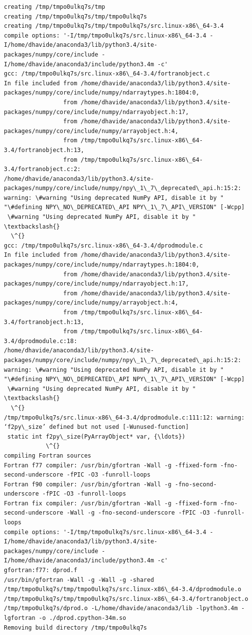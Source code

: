 \documentclass{article}
\begin{document}
\begin{Verbatim}[commandchars=\\\{\}]
creating /tmp/tmpo0ulkq7s/tmp
creating /tmp/tmpo0ulkq7s/tmp/tmpo0ulkq7s
creating /tmp/tmpo0ulkq7s/tmp/tmpo0ulkq7s/src.linux-x86\_64-3.4
compile options: '-I/tmp/tmpo0ulkq7s/src.linux-x86\_64-3.4 -I/home/dhavide/anaconda3/lib/python3.4/site-packages/numpy/core/include -I/home/dhavide/anaconda3/include/python3.4m -c'
gcc: /tmp/tmpo0ulkq7s/src.linux-x86\_64-3.4/fortranobject.c
In file included from /home/dhavide/anaconda3/lib/python3.4/site-packages/numpy/core/include/numpy/ndarraytypes.h:1804:0,
                 from /home/dhavide/anaconda3/lib/python3.4/site-packages/numpy/core/include/numpy/ndarrayobject.h:17,
                 from /home/dhavide/anaconda3/lib/python3.4/site-packages/numpy/core/include/numpy/arrayobject.h:4,
                 from /tmp/tmpo0ulkq7s/src.linux-x86\_64-3.4/fortranobject.h:13,
                 from /tmp/tmpo0ulkq7s/src.linux-x86\_64-3.4/fortranobject.c:2:
/home/dhavide/anaconda3/lib/python3.4/site-packages/numpy/core/include/numpy/npy\_1\_7\_deprecated\_api.h:15:2: warning: \#warning "Using deprecated NumPy API, disable it by " "\#defining NPY\_NO\_DEPRECATED\_API NPY\_1\_7\_API\_VERSION" [-Wcpp]
 \#warning "Using deprecated NumPy API, disable it by " \textbackslash{}
  \^{}
gcc: /tmp/tmpo0ulkq7s/src.linux-x86\_64-3.4/dprodmodule.c
In file included from /home/dhavide/anaconda3/lib/python3.4/site-packages/numpy/core/include/numpy/ndarraytypes.h:1804:0,
                 from /home/dhavide/anaconda3/lib/python3.4/site-packages/numpy/core/include/numpy/ndarrayobject.h:17,
                 from /home/dhavide/anaconda3/lib/python3.4/site-packages/numpy/core/include/numpy/arrayobject.h:4,
                 from /tmp/tmpo0ulkq7s/src.linux-x86\_64-3.4/fortranobject.h:13,
                 from /tmp/tmpo0ulkq7s/src.linux-x86\_64-3.4/dprodmodule.c:18:
/home/dhavide/anaconda3/lib/python3.4/site-packages/numpy/core/include/numpy/npy\_1\_7\_deprecated\_api.h:15:2: warning: \#warning "Using deprecated NumPy API, disable it by " "\#defining NPY\_NO\_DEPRECATED\_API NPY\_1\_7\_API\_VERSION" [-Wcpp]
 \#warning "Using deprecated NumPy API, disable it by " \textbackslash{}
  \^{}
/tmp/tmpo0ulkq7s/src.linux-x86\_64-3.4/dprodmodule.c:111:12: warning: ‘f2py\_size’ defined but not used [-Wunused-function]
 static int f2py\_size(PyArrayObject* var, {\ldots})
            \^{}
compiling Fortran sources
Fortran f77 compiler: /usr/bin/gfortran -Wall -g -ffixed-form -fno-second-underscore -fPIC -O3 -funroll-loops
Fortran f90 compiler: /usr/bin/gfortran -Wall -g -fno-second-underscore -fPIC -O3 -funroll-loops
Fortran fix compiler: /usr/bin/gfortran -Wall -g -ffixed-form -fno-second-underscore -Wall -g -fno-second-underscore -fPIC -O3 -funroll-loops
compile options: '-I/tmp/tmpo0ulkq7s/src.linux-x86\_64-3.4 -I/home/dhavide/anaconda3/lib/python3.4/site-packages/numpy/core/include -I/home/dhavide/anaconda3/include/python3.4m -c'
gfortran:f77: dprod.f
/usr/bin/gfortran -Wall -g -Wall -g -shared /tmp/tmpo0ulkq7s/tmp/tmpo0ulkq7s/src.linux-x86\_64-3.4/dprodmodule.o /tmp/tmpo0ulkq7s/tmp/tmpo0ulkq7s/src.linux-x86\_64-3.4/fortranobject.o /tmp/tmpo0ulkq7s/dprod.o -L/home/dhavide/anaconda3/lib -lpython3.4m -lgfortran -o ./dprod.cpython-34m.so
Removing build directory /tmp/tmpo0ulkq7s
    \end{Verbatim}
\end{document}
